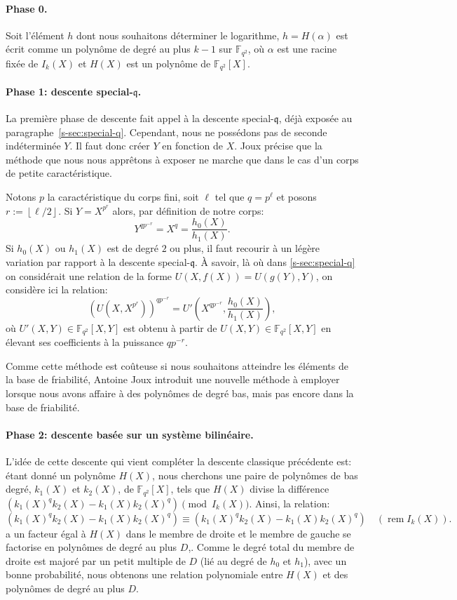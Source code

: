 \documentclass[a4paper, titlepage, 11pt]{article}
\theoremstyle{definition}
\theoremstyle{remark}
\def\gf #1{\mathbb{F}_{#1}}
\def\floor #1{\left\lfloor#1\right\rfloor}
\begin{document}
\paragraph{Phase 0.}Soit l'élément $h$ dont nous souhaitons déterminer le logarithme, $h = H(\alpha)$ est écrit comme un polynôme de degré au plus $k-1$ sur $\gf{q^2}$, où $\alpha$ est une racine fixée de $I_k(X)$ et $H(X)$ est un polynôme de $\gf{q^2}[X]$.

\paragraph{Phase 1: descente special-$\mathfrak{q}$.}La première phase de descente fait appel à la descente special-$\mathfrak{q}$, déjà exposée au paragraphe~\ref{s-sec:special-q}. Cependant, nous ne possédons pas de seconde indéterminée $Y$. Il faut donc créer $Y$ en fonction de $X$. Joux \cite{joux2013} précise que la méthode que nous nous apprêtons à exposer ne marche que dans le cas d'un corps de petite caractéristique.

Notons $p$ la caractéristique du corps fini, soit $\ell$ tel que $q = p^\ell$ et posons $r := \floor{\ell/2}$. Si $Y = X^{p^{r}}$ alors, par définition de notre corps:
$$Y^{qp^{-r}} = X^q = \frac{h_0(X)}{h_1(X)}.$$
Si $h_0(X)$ ou $h_1(X)$ est de degré $2$ ou plus, il faut recourir à un légère variation par rapport à la descente special-$\mathfrak{q}$. À	savoir, là où dans \ref{s-sec:special-q} on considérait une relation de la forme $U(X,f(X)) = U(g(Y),Y)$, on considère ici la relation:
$${\left({U(X,X^{p^r})}\right)}^{qp^{-r}} = U'\left( X^{qp^{-r}},\frac{h_0(X)}{h_1(X)}\right),$$
où $U'(X,Y) \in \gf{q^2}[X,Y]$ est obtenu à partir de $U(X,Y)\in \gf{q^2}[X,Y]$ en élevant ses coefficients à la puissance $qp^{-r}$.

Comme cette méthode est coûteuse si nous souhaitons atteindre les éléments de la base de friabilité, Antoine Joux \cite{joux2013} introduit une nouvelle méthode à employer lorsque nous avons affaire à des polynômes de degré bas, mais pas encore dans la base de friabilité.

\paragraph{Phase 2: descente basée sur un système bilinéaire.}L'idée de cette descente qui vient compléter la descente classique précédente est: étant donné un polynôme $H(X)$, nous cherchons une paire de polynômes de bas degré, $k_1(X)$ et $k_2(X)$, de $\gf{q^2}[X]$, tels que $H(X)$ divise la différence $(k_1(X)^qk_2(X)-k_1(X)k_2(X)^q) \pmod{I_k(X)}$. Ainsi, la relation:
$$(k_1(X)^qk_2(X)-k_1(X)k_2(X)^q) \equiv (k_1(X)^qk_2(X)-k_1(X)k_2(X)^q) \quad (\operatorname{rem}I_k(X)).$$
a un facteur égal à $H(X)$ dans le membre de droite et le membre de gauche se factorise en polynômes de degré au plus $D$,. Comme le degré total du membre de droite est majoré par un petit multiple de $D$ (lié au degré de $h_0$ et $h_1$), avec un bonne probabilité, nous obtenons une relation polynomiale entre $H(X)$ et des polynômes de degré au plus $D$.
\end{document}
